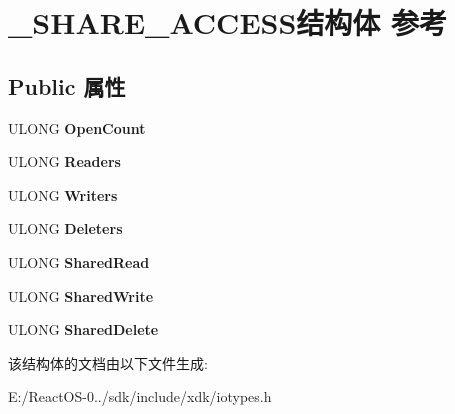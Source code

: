 \hypertarget{struct___s_h_a_r_e___a_c_c_e_s_s}{}\section{\+\_\+\+S\+H\+A\+R\+E\+\_\+\+A\+C\+C\+E\+S\+S结构体 参考}
\label{struct___s_h_a_r_e___a_c_c_e_s_s}
\subsection*{Public 属性}
\begin{DoxyCompactItemize}
\item 
\mbox{\label{struct___s_h_a_r_e___a_c_c_e_s_s_ac7c857e943754b2bee82db29a54a5c0f}} 
U\+L\+O\+NG {\bfseries Open\+Count}
\item 
\mbox{\label{struct___s_h_a_r_e___a_c_c_e_s_s_a8fba83f0cd02bb5cedb33fd8a829b2dc}} 
U\+L\+O\+NG {\bfseries Readers}
\item 
\mbox{\label{struct___s_h_a_r_e___a_c_c_e_s_s_a402f818df92a633266ff819d5f13a61e}} 
U\+L\+O\+NG {\bfseries Writers}
\item 
\mbox{\label{struct___s_h_a_r_e___a_c_c_e_s_s_a00698dc00f908c13eb521509c1869c05}} 
U\+L\+O\+NG {\bfseries Deleters}
\item 
\mbox{\label{struct___s_h_a_r_e___a_c_c_e_s_s_a4a80e1a9f2e8ce9d6b90056de82fb3e3}} 
U\+L\+O\+NG {\bfseries Shared\+Read}
\item 
\mbox{\label{struct___s_h_a_r_e___a_c_c_e_s_s_a7d8171792a082ffacb3ec8cb86081905}} 
U\+L\+O\+NG {\bfseries Shared\+Write}
\item 
\mbox{\label{struct___s_h_a_r_e___a_c_c_e_s_s_aaff475445b958e139a4738e0f878c35d}} 
U\+L\+O\+NG {\bfseries Shared\+Delete}
\end{DoxyCompactItemize}


该结构体的文档由以下文件生成\+:\begin{DoxyCompactItemize}
\item 
E\+:/\+React\+O\+S-\/0../sdk/include/xdk/iotypes.\+h\end{DoxyCompactItemize}
